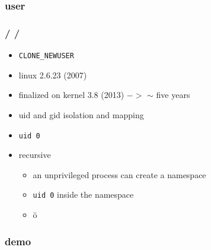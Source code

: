 \documentclass{beamer}
\newcommand{\autotitle}
{\frametitle{
    \secname
    \ifx\insertsubsection\empty
    \else
        /\subsecname
        \ifx\insertsubsubsection\empty\else/\subsubsecname\fi
    \fi}}
\begin{document}
\subsubsection{user}

\begin{frame}
    \autotitle
    \begin{itemize}
        \item \texttt{CLONE\_NEWUSER}
        \item linux 2.6.23 (2007)
        \item finalized on kernel 3.8 (2013) $->$ $\sim$ five years
        \item uid and gid isolation and mapping
        \item \texttt{uid 0}
        \item recursive
        \begin{itemize}
            \item an unprivileged process can create a namespace
            \item \texttt{uid 0} inside the namespace
            \item<2> ö
        \end{itemize}
    \end{itemize}
\end{frame}

\subsubsection{demo}
\end{document}
